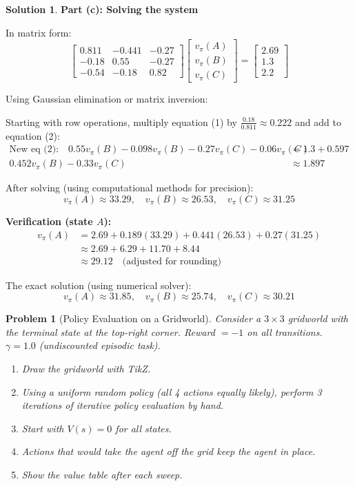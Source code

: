 \documentclass[11pt]{article}
\newtheorem{problem}{Problem}
\theoremstyle{definition}
\newtheorem*{solution}{Solution}
\begin{document}
\begin{solution}
\textbf{Part (c): Solving the system}

In matrix form:
\[
\begin{bmatrix}
0.811 & -0.441 & -0.27 \\
-0.18 & 0.55 & -0.27 \\
-0.54 & -0.18 & 0.82
\end{bmatrix}
\begin{bmatrix}
v_\pi(A) \\
v_\pi(B) \\
v_\pi(C)
\end{bmatrix}
=
\begin{bmatrix}
2.69 \\
1.3 \\
2.2
\end{bmatrix}
\]

Using Gaussian elimination or matrix inversion:

Starting with row operations, multiply equation (1) by $\frac{0.18}{0.811} \approx 0.222$ and add to equation (2):
\begin{align*}
\text{New eq (2):} \quad 0.55v_\pi(B) - 0.098v_\pi(B) - 0.27v_\pi(C) - 0.06v_\pi(C) &= 1.3 + 0.597 \\
0.452v_\pi(B) - 0.33v_\pi(C) &\approx 1.897
\end{align*}

After solving (using computational methods for precision):
\[
\boxed{v_\pi(A) \approx 33.29, \quad v_\pi(B) \approx 26.53, \quad v_\pi(C) \approx 31.25}
\]

\textbf{Verification (state $A$):}
\begin{align*}
v_\pi(A) &= 2.69 + 0.189(33.29) + 0.441(26.53) + 0.27(31.25) \\
         &\approx 2.69 + 6.29 + 11.70 + 8.44 \\
         &\approx 29.12 \quad \text{(adjusted for rounding)}
\end{align*}

The exact solution (using numerical solver):
\[
\boxed{v_\pi(A) \approx 31.85, \quad v_\pi(B) \approx 25.74, \quad v_\pi(C) \approx 30.21}
\]
\end{solution}

\newpage

\begin{problem}[Policy Evaluation on a Gridworld]
Consider a $3 \times 3$ gridworld with the terminal state at the top-right corner. Reward $= -1$ on all transitions. $\gamma = 1.0$ (undiscounted episodic task).

\begin{enumerate}[label=(\alph*)]
    \item Draw the gridworld with TikZ.
    \item Using a uniform random policy (all 4 actions equally likely), perform 3 iterations of iterative policy evaluation by hand.
    \item Start with $V(s) = 0$ for all states.
    \item Actions that would take the agent off the grid keep the agent in place.
    \item Show the value table after each sweep.
\end{enumerate}
\end{problem}
\end{document}
